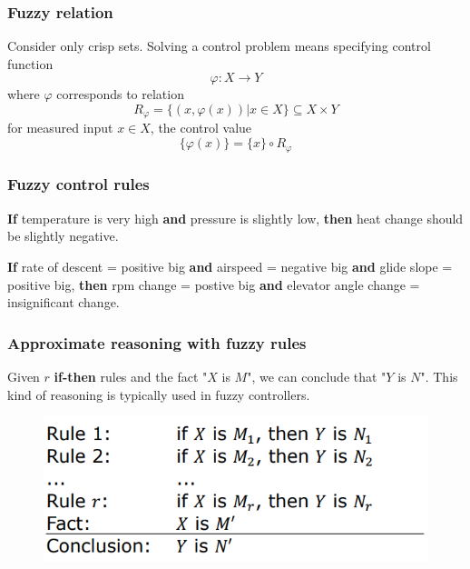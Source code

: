 \documentclass{article}
\begin{document}
\subsubsection{Fuzzy relation}
Consider only crisp sets. Solving a control problem means specifying control function
$$\varphi : X\rightarrow Y$$
where $\varphi$ corresponds to relation
$$R_{\varphi}=\{(x,\varphi(x))|x\in X\}\subseteq X\times Y$$
for measured input $x\in X$, the control value
$$\{\varphi(x)\}=\{x\}\circ R_\varphi$$

\subsubsection{Fuzzy control rules}
\textbf{If} temperature is very high \textbf{and} pressure is slightly low, \textbf{then}
heat change should be slightly negative.

\textbf{If} rate of descent = positive big \textbf{and} airspeed = negative big
\textbf{and} glide slope = positive big, \textbf{then} rpm change = postive big \textbf{and}
elevator angle change = insignificant change.

\subsubsection{Approximate reasoning with fuzzy rules}
Given $r$ \textbf{if-then} rules and the fact "$X$ is $M$", we can conclude that "$Y$ is $N$". This kind
of reasoning is typically used in fuzzy controllers.

\begin{figure}[H]
    \centering
    \includegraphics[scale=0.5]{images/schema-2.png}
\end{figure}
\end{document}

